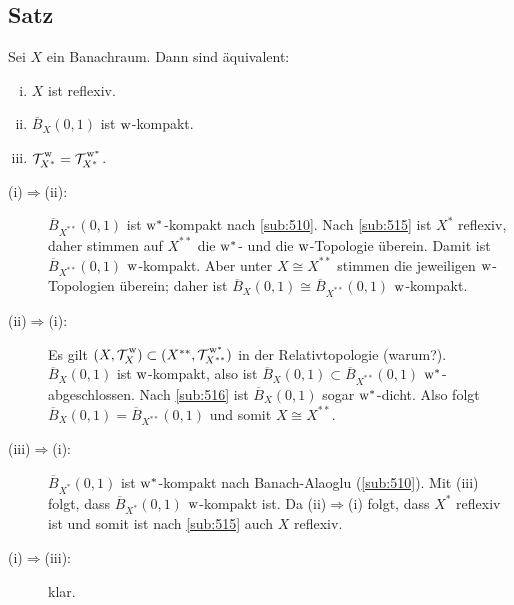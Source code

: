 \subsection[Satz: Äquivalenzen zu: $X$ ist reflexiv]{Satz} %
\label{sub:518}
Sei $X$ ein Banachraum. Dann sind äquivalent: 
\begin{enumerate}[(i)]
	\item $X$ ist reflexiv.
	\item $\overline{B}_X(0,1)$ ist $\mathrm{w}$-kompakt.
	\item $\weakT{X^*}= \weakTstar{X^*}$.
\end{enumerate}
\begin{description}
	\item[(i)$\Rightarrow$(ii):] $\overline{B}_{X^{**}}(0,1)$ ist $\mathrm{w}^*$-kompakt nach \ref{sub:510}. Nach \ref{sub:515} ist $X^*$ reflexiv, daher stimmen auf $X^{**}$
	die $\mathrm{w}^*$- und die $\mathrm{w}$-Topologie überein. Damit ist $ \overline{B}_{X^{**}}(0,1)$ $\mathrm{w}$-kompakt. Aber unter $X \cong X^{**}$ stimmen die jeweiligen $\mathrm{w}$-Topologien
	überein; daher ist $\overline{B}_{X}(0,1) \cong \overline{B}_{X^{**}}(0,1)$ $\mathrm{w}$-kompakt.
	\item[(ii)$\Rightarrow$(i):] Es gilt $(X,\weakT{X}) \subset (X^{**}, \weakTstar{X^{**}})$ in der Relativtopologie (warum?).
	$\overline{B}_X(0,1)$ ist $\mathrm{w}$-kompakt, also ist $\overline{B}_X(0,1) \subset \overline{B}_{X^{**}}(0,1)$ $\mathrm{w}^*$-abgeschlossen. Nach \ref{sub:516} ist $\overline{B}_X(0,1)$ 
	sogar $\mathrm{w}^*$-dicht. Also folgt $\overline{B}_X(0,1) = \overline{B}_{X^{**}}(0,1)$ und somit $X \cong X^{**}$.
	\item[(iii)$\Rightarrow$(i):] $\overline{B}_{X^*}(0,1)$ ist $\mathrm{w}^*$-kompakt nach Banach-Alaoglu (\ref{sub:510}). Mit (iii) folgt, dass $\overline{B}_{X^*}(0,1)$
	$\mathrm{w}$-kompakt ist. Da (ii)$\Rightarrow$(i) folgt, dass $X^*$ reflexiv ist und somit ist nach \ref{sub:515} auch $X$ reflexiv.
	\item[(i)$\Rightarrow$(iii):] klar. \bewende
\end{description}

